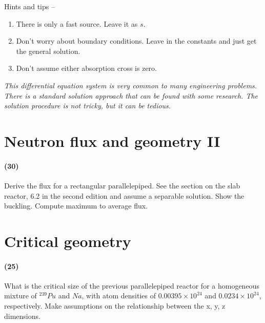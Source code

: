 \documentclass[11pt,a4paper]{article}
\begin{document}
\noindent Hints and tips --
\begin{enumerate}[leftmargin=*,topsep=0pt,label=(\alph*)]
    \item There is only a fast source. Leave it as $s$.
    \item Don't worry about boundary conditions. Leave in the constants and just get the general solution.
    \item Don't assume either absorption cross is zero.
\end{enumerate}

\vspace{\baselineskip}

\noindent\textit{This differential equation system is very common to many engineering problems. There is a standard solution approach that can be found with some research. The solution procedure is not tricky, but it can be tedious.}





\newpage

\section{Neutron flux and geometry II}
\paragraph*{(30)}
Derive the flux for a rectangular parallelepiped. See the section on the slab reactor, 6.2 in the second edition and assume a separable solution. Show the buckling. Compute maximum to average flux.





\newpage

\section{Critical geometry}
\paragraph*{(25)}
What is the critical size of the previous parallelepiped reactor for a homogeneous mixture of $^{239}Pu$ and $Na$, with atom densities of $0.00395 \times 10^{24}$ and $0.0234 \times 10^{24}$, respectively. Make assumptions on the relationship between the x, y, z dimensions.





\newpage
\end{document}
